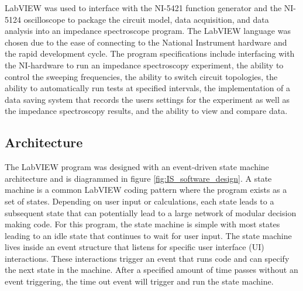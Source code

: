 \par LabVIEW was used to interface with the NI-5421 function generator and the NI-5124 oscilloscope to package the circuit model, data acquisition, and data analysis into an impedance spectroscope program. The LabVIEW language was chosen due to the ease of connecting to the National Instrument hardware and the rapid development cycle. The program specifications include interfacing with the NI-hardware to run an impedance spectroscopy experiment, the ability to control the sweeping frequencies, the ability to switch circuit topologies, the ability to automatically run tests at specified intervals, the implementation of a data saving system that records the users settings for the experiment as well as the impedance spectroscopy results, and the ability to view and compare data.



\subsection{Architecture}

\par The LabVIEW program was designed with an event-driven state machine architecture and is diagrammed in figure \ref{fig:IS_software_design}. A state machine is a common LabVIEW coding pattern where the program exists as a set of states. Depending on user input or calculations, each state leads to a subsequent state that can potentially lead to a large network of modular decision making code. For this program, the state machine is simple with most states leading to an idle state that continues to wait for user input. The state machine lives inside an event structure that listens for specific user interface (UI) interactions. These interactions trigger an event that runs code and can specify the next state in the machine. After a specified amount of time passes without an event triggering, the time out event will trigger and run the state machine.    

